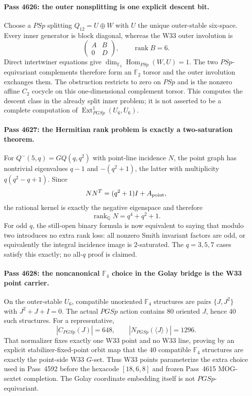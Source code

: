 \paragraph{Pass 4626: the outer nonsplitting is one explicit descent bit.}
Choose a $PSp$ splitting $Q_{12}=U\oplus W$ with $U$ the unique outer-stable
six-space.  Every inner generator is block diagonal, whereas the W33 outer
involution is
\[
 \begin{pmatrix}A&B\\0&D\end{pmatrix},\qquad \operatorname{rank}B=6.
\]
Direct intertwiner equations give
$\dim_{\mathbb F_2}\operatorname{Hom}_{PSp}(W,U)=1$.  The two $PSp$-equivariant
complements therefore form an $\mathbb F_2$ torsor and the outer involution
exchanges them.  The obstruction restricts to zero on $PSp$ and is the nonzero
affine $C_2$ cocycle on this one-dimensional complement torsor.  This computes
the descent class in the already split inner problem; it is not asserted to be
a complete computation of $\operatorname{Ext}^1_{PGSp}(U_6,U_6)$.

\paragraph{Pass 4627: the Hermitian rank problem is exactly a two-saturation theorem.}
For $Q^-(5,q)=GQ(q,q^2)$ with point-line incidence $N$, the point graph has
nontrivial eigenvalues $q-1$ and $-(q^2+1)$, the latter with multiplicity
$q(q^2-q+1)$.  Since
\[
 NN^T=(q^2+1)I+A_{\rm point},
\]
the rational kernel is exactly the negative eigenspace and therefore
\[
 \boxed{\operatorname{rank}_{\mathbb Q}N=q^4+q^2+1}.
\]
For odd $q$, the still-open binary formula is now equivalent to saying that
modulo two introduces no extra rank loss: all nonzero Smith invariant factors
are odd, or equivalently the integral incidence image is $2$-saturated.  The
$q=3,5,7$ cases satisfy this exactly; no all-$q$ proof is claimed.

\paragraph{Pass 4628: the noncanonical $\mathbb F_4$ choice in the Golay bridge is the W33 point carrier.}
On the outer-stable $U_6$, compatible unoriented $\mathbb F_4$ structures are
pairs $\{J,J^2\}$ with $J^2+J+I=0$.  The actual $PGSp$ action contains $80$
oriented $J$, hence $40$ such structures.  For a representative,
\[
 |C_{PGSp}(J)|=648,\qquad |N_{PGSp}(\langle J\rangle)|=1296.
\]
That normalizer fixes exactly one W33 point and no W33 line, proving by an
explicit stabilizer-fixed-point orbit map that the $40$ compatible $\mathbb F_4$
structures are exactly the point-side W33 $G$-set.  Thus W33 points parameterize
the extra choice used in Pass~4592 before the hexacode $[18,6,8]$ and frozen
Pass~4615 MOG-sextet completion.  The Golay coordinate embedding itself is not
$PGSp$-equivariant.

